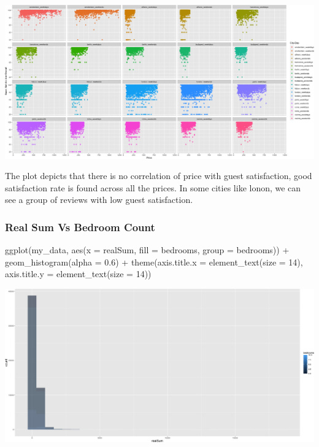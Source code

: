 \documentclass[
]{article}
\newenvironment{Shaded}{\begin{snugshade}}{\end{snugshade}}
\newcommand{\AttributeTok}[1]{\textcolor[rgb]{0.77,0.63,0.00}{#1}}
\newcommand{\DecValTok}[1]{\textcolor[rgb]{0.00,0.00,0.81}{#1}}
\newcommand{\FloatTok}[1]{\textcolor[rgb]{0.00,0.00,0.81}{#1}}
\newcommand{\FunctionTok}[1]{\textcolor[rgb]{0.00,0.00,0.00}{#1}}
\newcommand{\NormalTok}[1]{#1}
\newcommand{\SpecialCharTok}[1]{\textcolor[rgb]{0.00,0.00,0.00}{#1}}
\begin{document}
\includegraphics{Project_files/figure-latex/unnamed-chunk-24-2.png}

The plot depicts that there is no correlation of price with guest
satisfaction, good satisfaction rate is found across all the prices. In
some cities like lonon, we can see a group of reviews with low guest
satisfaction.

\hypertarget{real-sum-vs-bedroom-count}{%
\subsubsection{Real Sum Vs Bedroom
Count}\label{real-sum-vs-bedroom-count}}

\begin{Shaded}
\begin{Highlighting}[]
\FunctionTok{ggplot}\NormalTok{(my\_data, }\FunctionTok{aes}\NormalTok{(}\AttributeTok{x =}\NormalTok{ realSum, }\AttributeTok{fill =}\NormalTok{ bedrooms, }\AttributeTok{group =}\NormalTok{ bedrooms)) }\SpecialCharTok{+}
    \FunctionTok{geom\_histogram}\NormalTok{(}\AttributeTok{alpha =} \FloatTok{0.6}\NormalTok{) }\SpecialCharTok{+} \FunctionTok{theme}\NormalTok{(}\AttributeTok{axis.title.x =} \FunctionTok{element\_text}\NormalTok{(}\AttributeTok{size =} \DecValTok{14}\NormalTok{),}
    \AttributeTok{axis.title.y =} \FunctionTok{element\_text}\NormalTok{(}\AttributeTok{size =} \DecValTok{14}\NormalTok{))}
\end{Highlighting}
\end{Shaded}

\includegraphics{Project_files/figure-latex/unnamed-chunk-25-1.png}
\end{document}
